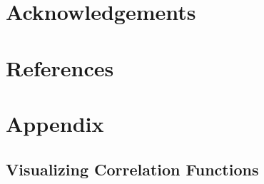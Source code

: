 \documentclass[%
 reprint,
 amsmath,amssymb,
 aps,nofootinbib
]{revtex4-1}
\begin{document}
\section{Acknowledgements}



\onecolumngrid

\section{References}
\vspace{-.2825in}





\newpage

\section{Appendix}

\subsection{Visualizing Correlation Functions}
\end{document}
